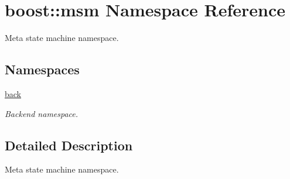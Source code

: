 \hypertarget{namespaceboost_1_1msm}{\section{boost\-:\-:msm Namespace Reference}
\label{namespaceboost_1_1msm}
}


Meta state machine namespace.  


\subsection*{Namespaces}
\begin{DoxyCompactItemize}
\item 
\hyperlink{namespaceboost_1_1msm_1_1back}{back}
\begin{DoxyCompactList}\small\item\em Backend namespace. \end{DoxyCompactList}\end{DoxyCompactItemize}


\subsection{Detailed Description}
Meta state machine namespace. 